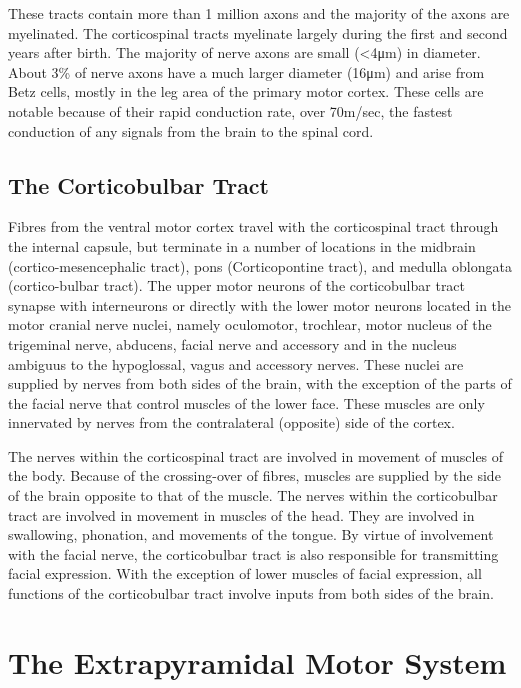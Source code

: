 These tracts contain more than 1 million axons and the majority of the axons are myelinated. The corticospinal tracts myelinate largely during the first and second years after birth. The majority of nerve axons are small (\textless4μm) in diameter. About 3\% of nerve axons have a much larger diameter (16μm) and arise from Betz cells, mostly in the leg area of the primary motor cortex. These cells are notable because of their rapid conduction rate, over 70m/sec, the fastest conduction of any signals from the brain to the spinal cord.

\hypertarget{the-corticobulbar-tract-1}{%
\subsection{The Corticobulbar Tract}\label{the-corticobulbar-tract-1}}

Fibres from the ventral motor cortex travel with the corticospinal tract through the internal capsule, but terminate in a number of locations in the midbrain (cortico-mesencephalic tract), pons (Corticopontine tract), and medulla oblongata (cortico-bulbar tract). The upper motor neurons of the corticobulbar tract synapse with interneurons or directly with the lower motor neurons located in the motor cranial nerve nuclei, namely oculomotor, trochlear, motor nucleus of the trigeminal nerve, abducens, facial nerve and accessory and in the nucleus ambiguus to the hypoglossal, vagus and accessory nerves. These nuclei are supplied by nerves from both sides of the brain, with the exception of the parts of the facial nerve that control muscles of the lower face. These muscles are only innervated by nerves from the contralateral (opposite) side of the cortex.

The nerves within the corticospinal tract are involved in movement of muscles of the body. Because of the crossing-over of fibres, muscles are supplied by the side of the brain opposite to that of the muscle. The nerves within the corticobulbar tract are involved in movement in muscles of the head. They are involved in swallowing, phonation, and movements of the tongue. By virtue of involvement with the facial nerve, the corticobulbar tract is also responsible for transmitting facial expression. With the exception of lower muscles of facial expression, all functions of the corticobulbar tract involve inputs from both sides of the brain.

\hypertarget{the-extrapyramidal-motor-system}{%
\section{The Extrapyramidal Motor System}\label{the-extrapyramidal-motor-system}}


